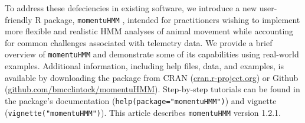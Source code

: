 \documentclass[12pt]{article}\usepackage[]{graphicx}\usepackage[]{color}
\begin{document}
To address these defeciencies in existing software, we introduce a new user-friendly R package, \verb|momentuHMM|%
, intended for practitioners wishing to implement more flexible and realistic HMM analyses of animal movement while accounting for common challenges associated with telemetry data. %
We provide a brief overview of \verb|momentuHMM| and demonstrate some of its capabilities using real-world examples. %
Additional information, including help files, data, and examples, is available by downloading the package from CRAN (\url{cran.r-project.org}) or Github (\url{github.com/bmcclintock/momentuHMM}). Step-by-step tutorials can be found in the package's documentation (\verb|help(package="momentuHMM")|) and vignette (\verb|vignette("momentuHMM")|). This article describes \verb|momentuHMM| version 1.2.1.
\end{document}
